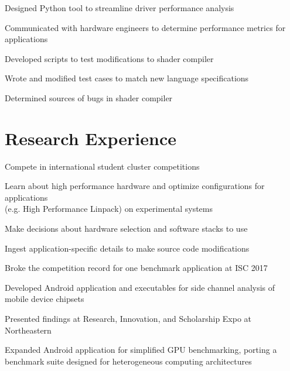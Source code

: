 \documentclass[]{deedy-resume-openfont}
\begin{document}
\vspace{2mm}
\vspace{1mm}
\begin{tightemize}
\item Designed Python tool to streamline driver performance analysis
\item Communicated with hardware engineers to determine performance metrics for applications
\item Developed scripts to test modifications to shader compiler
\item Wrote and modified test cases to match new language specifications
\item Determined sources of bugs in shader compiler
\end{tightemize}
\vspace{0.6mm}

\section{\hfill Research Experience \hfill}

\vspace{0.8mm}
\begin{tightemize}
\item Compete in international student cluster competitions
\item Learn about high performance hardware and optimize configurations for applications \\(e.g. High Performance Linpack) on experimental systems
\item Make decisions about hardware selection and software stacks to use
\item Ingest application-specific details to make source code modifications
\item Broke the competition record for one benchmark application at ISC 2017
\end{tightemize}

\vspace{2mm}
\vspace{1mm}
\begin{tightemize}
\item Developed Android application and executables for side channel analysis of mobile device chipsets
\item Presented findings at Research, Innovation, and Scholarship Expo at Northeastern
\item Expanded Android application for simplified GPU benchmarking, porting a benchmark suite designed for heterogeneous computing architectures
\end{tightemize}
\end{document}
